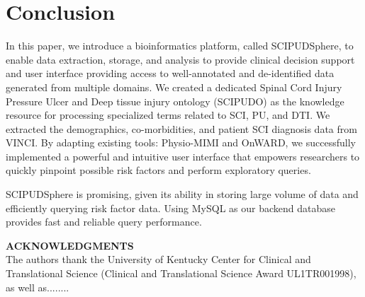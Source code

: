 \documentclass{amia}
\begin{document}
\section{Conclusion}
In this paper, we introduce a bioinformatics platform, called SCIPUDSphere, to enable data extraction, storage, and analysis to provide clinical decision support and user interface providing access to well-annotated and de-identified data generated from multiple domains. We created a dedicated Spinal Cord Injury Pressure Ulcer and Deep tissue injury ontology (SCIPUDO) as the knowledge resource for processing specialized terms related to SCI, PU, and DTI. We extracted the demographics, co-morbidities, and patient SCI diagnosis data from VINCI. By adapting existing tools: Physio-MIMI and OnWARD, we successfully implemented a powerful and intuitive user interface that empowers researchers to quickly pinpoint possible risk factors and perform exploratory queries.

SCIPUDSphere is promising, given its ability in storing large volume of data and efficiently querying risk factor data. Using MySQL as our backend database provides fast and reliable query performance.


\textbf{ACKNOWLEDGMENTS}\\
The authors thank the University of Kentucky Center for Clinical and Translational Science (Clinical and Translational Science Award UL1TR001998), as well as........

\makeatletter
\renewcommand{\@biblabel}[1]{\hfill #1.}
\makeatother
\end{document}
